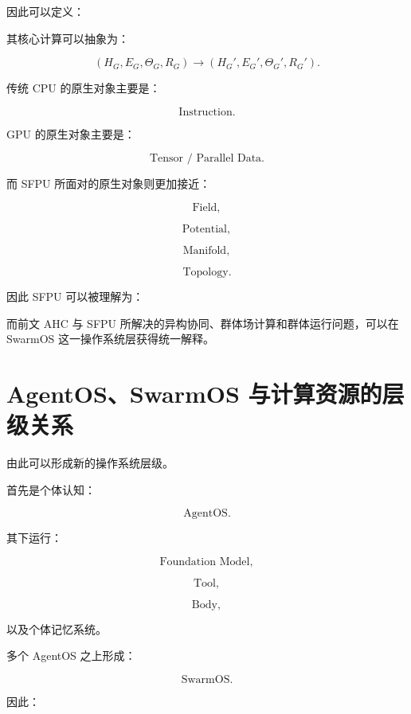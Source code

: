 因此可以定义：

\begin{statementbox}
\centering
{}
\end{statementbox}

其核心计算可以抽象为：

\[
(H_G,E_G,\Theta_G,R_G)
\rightarrow
(H_G',E_G',\Theta_G',R_G').
\]

传统 CPU 的原生对象主要是：

\[
\text{Instruction}.
\]

GPU 的原生对象主要是：

\[
\text{Tensor / Parallel Data}.
\]

而 SFPU 所面对的原生对象则更加接近：

\[
\text{Field},
\]

\[
\text{Potential},
\]

\[
\text{Manifold},
\]

\[
\text{Topology}.
\]

因此 SFPU 可以被理解为：

\begin{statementbox}
\centering
{}
\end{statementbox}

而前文 AHC 与 SFPU 所解决的异构协同、群体场计算和群体运行问题，可以在 SwarmOS 这一操作系统层获得统一解释。


\section{AgentOS、SwarmOS 与计算资源的层级关系}

由此可以形成新的操作系统层级。

首先是个体认知：

\[
\mathrm{AgentOS}.
\]

其下运行：

\[
\text{Foundation Model},
\]

\[
\text{Tool},
\]

\[
\text{Body},
\]

以及个体记忆系统。

多个 AgentOS 之上形成：

\[
\mathrm{SwarmOS}.
\]

因此：

\begin{statementbox}
\centering
{}
\end{statementbox}

